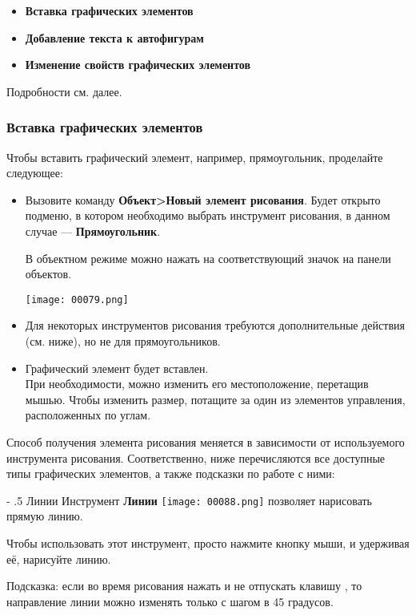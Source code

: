 \documentclass[a4paper,10pt]{article}
\makeatletter
\renewcommand\paragraph{%
   \@startsection{paragraph}{4}{0mm}%
      {-\baselineskip}%
      {.5\baselineskip}%
      {\normalfont\normalsize\bfseries}}
\makeatother
\begin{document}
\begin{itemize}
 \item \textbf{Вставка графических элементов}
 \item \textbf{Добавление текста к автофигурам}
 \item \textbf{Изменение свойств графических элементов}
\end{itemize}

Подробности см. далее.

\subsubsection{Вставка графических элементов}
Чтобы вставить графический элемент, например, прямоугольник, проделайте следующее: 
\begin{itemize}
 \item Вызовите команду \textbf{Объект>Новый элемент рисования}. Будет открыто подменю, в котором необходимо выбрать инструмент рисования, в данном случае --- \textbf{Прямоугольник}.
 
 В объектном режиме можно нажать на соответствующий значок на панели объектов.
 
 \texttt{[image: 00079.png]}
 
 \item Для некоторых инструментов рисования требуются дополнительные действия (см. ниже), но не для прямоугольников.
 \item Графический элемент будет вставлен.\\
 При необходимости, можно изменить его местоположение, перетащив мышью. Чтобы изменить размер, потащите за один из элементов управления, расположенных по углам.
\end{itemize}

Способ получения элемента рисования меняется в зависимости от используемого инструмента рисования. Соответственно, ниже перечисляются все доступные типы графических элементов, а также подсказки по работе с ними:

\paragraph{Линии}
Инструмент \textbf{Линии} \texttt{[image: 00088.png]} позволяет нарисовать прямую линию.

Чтобы использовать этот инструмент, просто нажмите кнопку мыши, и удерживая её, нарисуйте линию.

Подсказка: если во время рисования нажать и не отпускать клавишу , то направление линии можно изменять только с шагом в 45 градусов.
\end{document}
